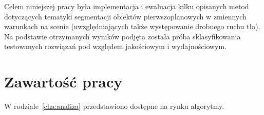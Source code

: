Celem niniejszej pracy była implementacja i ewaluacja kilku opisanych metod dotyczących tematyki segmentacji obiektów pierwszoplanowych w zmiennych warunkach na scenie (uwzględniających także występowanie drobnego ruchu tła). Na podstawie otrzymanych wyników podjęta została próba sklasyfikowania testowanych rozwiązań pod względem jakościowym i wydajnościowym.



\section{Zawartość pracy}
\label{sec:zawartoscPracy}

W rodziale~\ref{cha:analiza} przedstawiono dostępne na rynku algorytmy. 


















